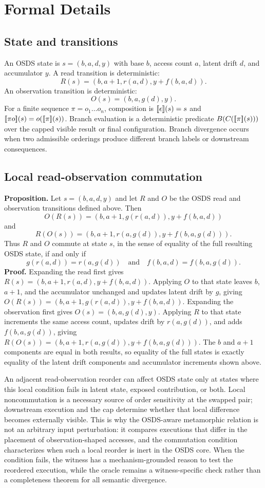 \section{Formal Details}

\subsection{State and transitions}
An OSDS state is $s=(b,a,d,y)$ with base $b$, access count $a$, latent drift $d$, and accumulator $y$. A read transition is deterministic:
\[
R(s)= (b,a+1,r(a,d), y+f(b,a,d)).
\]
An observation transition is deterministic:
\[
O(s)= (b,a,g(d),y).
\]
For a finite sequence $\pi=o_1\ldots o_n$, composition is $\lbrack\!\lbrack \epsilon \rbrack\!\rbrack(s)=s$ and $\lbrack\!\lbrack \pi o \rbrack\!\rbrack(s)=o(\lbrack\!\lbrack \pi \rbrack\!\rbrack(s))$. Branch evaluation is a deterministic predicate $B(C(\lbrack\!\lbrack \pi \rbrack\!\rbrack(s)))$ over the capped visible result or final configuration. Branch divergence occurs when two admissible orderings produce different branch labels or downstream consequences.

\subsection{Local read-observation commutation}
\label{app:local-commutation}
\textbf{Proposition.} Let $s=(b,a,d,y)$ and let $R$ and $O$ be the OSDS read and observation transitions defined above. Then
\[
O(R(s))=(b,a+1,g(r(a,d)),y+f(b,a,d))
\]
and
\[
R(O(s))=(b,a+1,r(a,g(d)),y+f(b,a,g(d))).
\]
Thus $R$ and $O$ commute at state $s$, in the sense of equality of the full resulting OSDS state, if and only if
\[
g(r(a,d))=r(a,g(d))
\quad\text{and}\quad
f(b,a,d)=f(b,a,g(d)).
\]
\textbf{Proof.} Expanding the read first gives $R(s)=(b,a+1,r(a,d),y+f(b,a,d))$. Applying $O$ to that state leaves $b$, $a+1$, and the accumulator unchanged and updates latent drift by $g$, giving $O(R(s))=(b,a+1,g(r(a,d)),y+f(b,a,d))$. Expanding the observation first gives $O(s)=(b,a,g(d),y)$. Applying $R$ to that state increments the same access count, updates drift by $r(a,g(d))$, and adds $f(b,a,g(d))$, giving $R(O(s))=(b,a+1,r(a,g(d)),y+f(b,a,g(d)))$. The $b$ and $a+1$ components are equal in both results, so equality of the full states is exactly equality of the latent drift components and accumulator increments shown above.

An adjacent read-observation reorder can affect OSDS state only at states where this local condition fails in latent state, exposed contribution, or both. Local noncommutation is a necessary source of order sensitivity at the swapped pair; downstream execution and the cap determine whether that local difference becomes externally visible. This is why the OSDS-aware metamorphic relation is not an arbitrary input perturbation: it compares executions that differ in the placement of observation-shaped accesses, and the commutation condition characterizes when such a local reorder is inert in the OSDS core. When the condition fails, the witness has a mechanism-grounded reason to test the reordered execution, while the oracle remains a witness-specific check rather than a completeness theorem for all semantic divergence.


